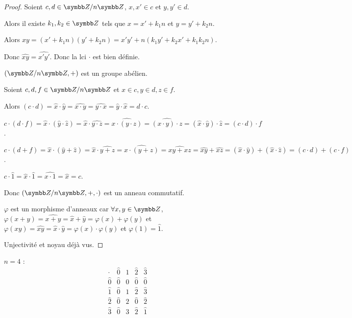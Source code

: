 \begin{proof}
    Soient $c, d \in \Z / n \Z$, $x, x' \in c$ et $y, y' \in d$. 

    Alors il existe $k_1, k_2 \in \Z$ tels que $x = x' + k_1 n$ et $y = y' + k_2 n$.

    Alors $xy = (x' + k_1 n)(y' + k_2 n) = x'y' + n(k_1 y' + k_2 x' + k_1 k_2 n)$.

    Donc $\widehat{xy} = \widehat{x'y'}$. Donc la lci $\cdot$ est bien définie.

    \avspace $(\Z / n \Z, +)$ est un groupe abélien.

    \avspace Soient $c, d, f \in \Z / n \Z$ et $x \in c, y \in d, z \in f$.

    Alors $(c \cdot d) = \widehat{x} \cdot \widehat{y} = \widehat{x \cdot y} = \widehat{y \cdot x} = \widehat{y} \cdot \widehat{x} = d \cdot c$.

    $c \cdot (d \cdot f) = \widehat{x} \cdot (\widehat{y} \cdot \widehat{z}) = \widehat{x} \cdot \widehat{y \cdot z} = \widehat{x \cdot (y \cdot z)} = \widehat{(x \cdot y) \cdot z} = (\widehat{x} \cdot \widehat{y}) \cdot \widehat{z} = (c \cdot d) \cdot f$.

    $c \cdot (d + f) = \widehat{x} \cdot (\widehat{y} + \widehat{z}) = \widehat{x} \cdot \widehat{y + z} = \widehat{x \cdot (y + z)} = \widehat{xy + xz} = \widehat{xy} + \widehat{xz} = (\widehat{x} \cdot \widehat{y}) + (\widehat{x} \cdot \widehat{z}) = (c \cdot d) + (c \cdot f)$.

    $c \cdot \widehat{1} = \widehat{x} \cdot \widehat{1} = \widehat{x \cdot 1} = \widehat{x} = c$.

    Donc $(\Z / n \Z, +, \cdot)$ est un anneau commutatif.

    \avspace $\varphi$ est un morphisme d'anneaux car $\forall x, y \in \Z$, 
    $\varphi(x + y) = \widehat{x + y} = \widehat{x} + \widehat{y} = \varphi(x) + \varphi(y)$ et 
    $\varphi(xy) = \widehat{xy} = \widehat{x} \cdot \widehat{y} = \varphi(x) \cdot \varphi(y)$ et 
    $\varphi(1) = \widehat{1}$.
    
    Unjectivité et noyau déjà vus.
\end{proof}

\begin{exemple}
    $n = 4$ :
    \[
        \begin{array}{c|cccc}
            \cdot & \widehat{0} & \widehat{1} & \widehat{2} & \widehat{3} \\
            \hline
            \widehat{0} & \widehat{0} & \widehat{0} & \widehat{0} & \widehat{0} \\
            \widehat{1} & \widehat{0} & \widehat{1} & \widehat{2} & \widehat{3} \\
            \widehat{2} & \widehat{0} & \widehat{2} & \widehat{0} & \widehat{2} \\
            \widehat{3} & \widehat{0} & \widehat{3} & \widehat{2} & \widehat{1} 
        \end{array}
    \]

\end{exemple}


